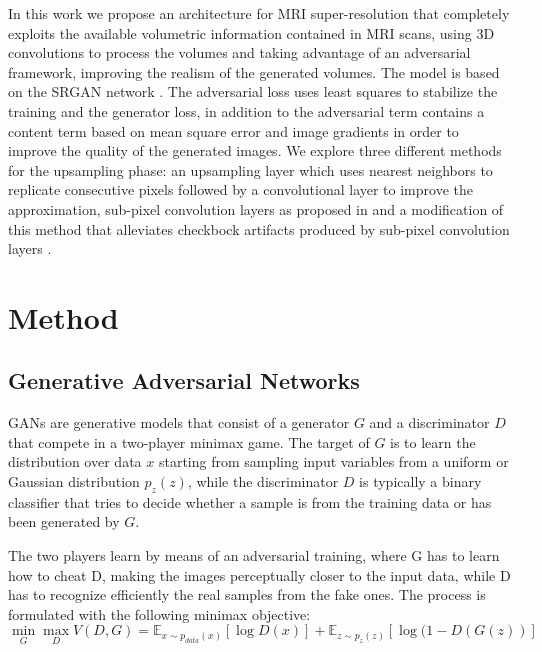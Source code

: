 \documentclass{article}
\begin{document}
In this work we propose an architecture for MRI super-resolution that completely exploits the available volumetric information contained in MRI scans, using 3D convolutions to process the volumes and taking advantage of an adversarial framework, improving the realism of the generated volumes.
The model is based on the SRGAN network \cite{ledig:srgan}. The adversarial loss uses least squares to stabilize the training and the generator loss, in addition to the adversarial term contains a content term based on mean square error and image gradients in order to improve the quality of the generated images. We explore three different methods for the upsampling phase: an upsampling layer which uses nearest neighbors to replicate consecutive pixels followed by a convolutional layer to improve the approximation, sub-pixel convolution layers as proposed in \cite{shi:subpixel} and a modification of this method \cite{aitken:checkboardfree} that alleviates checkbock artifacts produced by sub-pixel convolution layers \cite{odena:deconv}.



\section{Method}
\label{sec:method}

\subsection{Generative Adversarial Networks}
\label{ssec:GANs}

GANs\cite{goodf:gan} are generative models that consist of a generator $G$ and a discriminator $D$ that compete in a two-player minimax game. The target of $G$ is to learn the distribution over data $x$ starting from sampling input variables from a uniform or Gaussian distribution  $p_z(z)$, while the discriminator $D$ is typically a binary classifier that tries to decide whether a sample is from the training data or has been generated by $G$.

The two players learn by means of an adversarial training, where G has to learn how to cheat D, making the images perceptually closer to the input data, while D has to recognize efficiently the real samples from the fake ones.
The process is formulated with the following minimax objective:
\begin{equation}\label{eq:minimax}
	\min_{G} \max_{D} V(D,G) = \mathbb{E}_{x \sim p_{data}(x)}[\log D(x)]+ \mathbb{E}_{z \sim p_{z}(z)}[\log (1-D(G(z))]
\end{equation}
\end{document}
